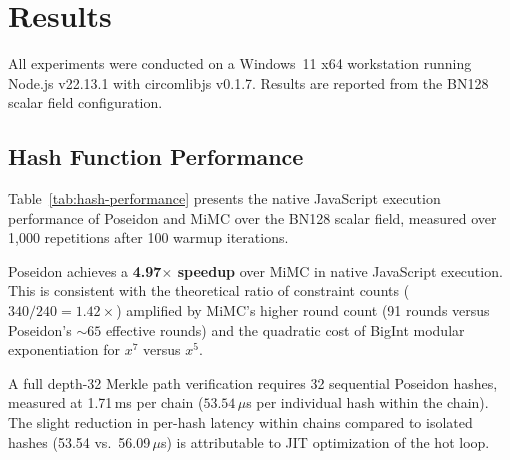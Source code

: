 
\section{Results}
\label{sec:results}

All experiments were conducted on a Windows~11 x64 workstation running Node.js v22.13.1 with circomlibjs v0.1.7. Results are reported from the BN128 scalar field configuration.

\subsection{Hash Function Performance}

Table~\ref{tab:hash-performance} presents the native JavaScript execution performance of Poseidon and MiMC over the BN128 scalar field, measured over 1{,}000 repetitions after 100 warmup iterations.

\begin{table}[htbp]
\centering
\caption{Hash function performance in native JavaScript (BN128 field).}
\label{tab:hash-performance}
\end{table}

Poseidon achieves a \textbf{4.97$\times$ speedup} over MiMC in native JavaScript execution. This is consistent with the theoretical ratio of constraint counts ($340/240 = 1.42\times$) amplified by MiMC's higher round count (91 rounds versus Poseidon's ${\sim}65$ effective rounds) and the quadratic cost of BigInt modular exponentiation for $x^7$ versus $x^5$.

A full depth-32 Merkle path verification requires 32 sequential Poseidon hashes, measured at 1.71\,ms per chain ($53.54\,\mu$s per individual hash within the chain). The slight reduction in per-hash latency within chains compared to isolated hashes (53.54 vs.\ 56.09\,$\mu$s) is attributable to JIT optimization of the hot loop.

